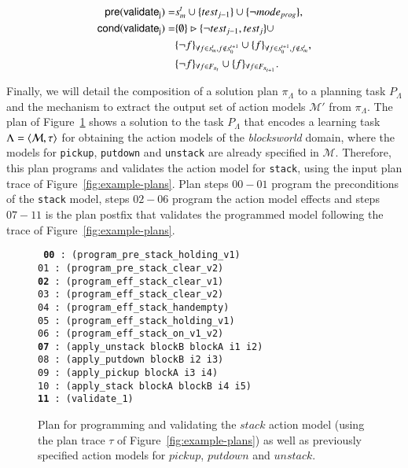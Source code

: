 \begin{small}
	\begin{align*}
	\hspace*{7pt}\mathsf{pre}(\mathsf{validate_{j}})=&s_m^t\cup\{test_{j-1}\}\cup \{\neg mode_{prog}\},\\
	\mathsf{cond}(\mathsf{validate_{j}})=&\{\emptyset\}\rhd\{\neg test_{j-1},test_j\} \cup \\
	&\{\neg f\}_{\forall f\in s_m^t, f \notin s_0^{t+1}}\cup \{f\}_{\forall f\in s_0^{t+1}, f \notin s_m^t},\\
	&\{\neg f\}_{\forall f\in F_{\pi_t}}\cup \{f\}_{\forall f\in F_{\pi_{t+1}}}.\\
	\end{align*}
\end{small}

Finally, we will detail the composition of a solution plan $\pi_\Lambda$ to a planning task $P_\Lambda$ and the mechanism to extract the output set of action models $\mathcal{M}'$ from $\pi_\Lambda$. The plan of Figure~\ref{fig:plan-lplan} shows a solution to the task $P_{\Lambda}$ that encodes a learning task $\Lambda={\langle \mathcal{M},\tau \rangle}$ for obtaining the action models of the {\em blocksworld} domain, where the models for {\tt\small pickup}, {\tt\small putdown} and {\tt\small unstack} are already specified in $\mathcal{M}$. Therefore, this plan programs and validates the action model for {\tt\small stack}, using the input plan trace of Figure~\ref{fig:example-plans}. Plan steps $00-01$ program the preconditions of the {\tt\small stack} model, steps $02-06$ program the action model effects and steps $07-11$ is the plan postfix that validates the programmed model following the trace of Figure~\ref{fig:example-plans}.

\begin{figure}[hbt!]
	{\footnotesize\tt
		{\bf 00} : (program\_pre\_stack\_holding\_v1) \\
		01 : (program\_pre\_stack\_clear\_v2)\\
		{\bf 02} : (program\_eff\_stack\_clear\_v1)\\
		03 : (program\_eff\_stack\_clear\_v2)\\
		04 : (program\_eff\_stack\_handempty)\\
		05 : (program\_eff\_stack\_holding\_v1)\\
		06 : (program\_eff\_stack\_on\_v1\_v2)\\
		{\bf 07} : (apply\_unstack blockB blockA i1 i2)\\
		08 : (apply\_putdown blockB i2 i3)\\
		09 : (apply\_pickup blockA i3 i4)\\
		10 : (apply\_stack blockA blockB i4 i5)\\
		{\bf 11} : (validate\_1)
	}
	\caption{\small Plan for programming and validating the $stack$ action model (using the plan trace $\tau$ of Figure~\ref{fig:example-plans}) as well as previously specified action models for $pickup$, $putdown$ and $unstack$.}
	\label{fig:plan-lplan}
\end{figure}

